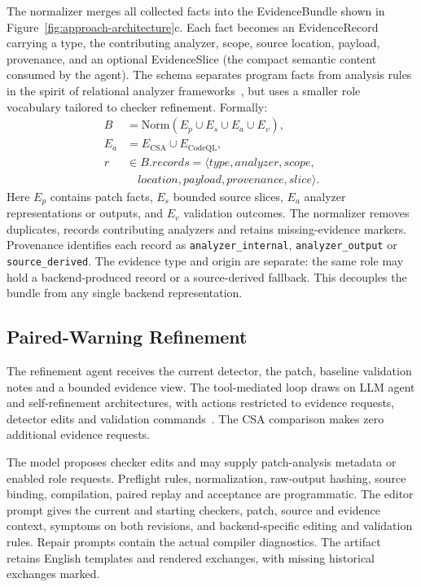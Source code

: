 The normalizer merges all collected facts into the EvidenceBundle shown in Figure~\ref{fig:approach-architecture}c.
Each fact becomes an EvidenceRecord carrying a type, the contributing analyzer, scope, source location, payload, provenance, and an optional EvidenceSlice (the compact semantic content consumed by the agent).
The schema separates program facts from analysis rules in the spirit of relational analyzer frameworks~\cite{avgustinov2016ql,jordan2016souffle,bravenboer2009doop}, but uses a smaller role vocabulary tailored to checker refinement.
Formally:
\begin{equation}
\begin{aligned}
B &= \mathrm{Norm}(E_p \cup E_s \cup E_a \cup E_v),\\
E_a &= E_{\mathrm{CSA}} \cup E_{\mathrm{CodeQL}},\\
r &\in B.records = \langle type, analyzer, scope,\\
&\quad location, payload, provenance, slice\rangle.
\end{aligned}
\label{eq:evidence-bundle}
\end{equation}
Here $E_p$ contains patch facts, $E_s$ bounded source slices, $E_a$ analyzer representations or outputs, and $E_v$ validation outcomes.
The normalizer removes duplicates, records contributing analyzers and retains missing-evidence markers.
Provenance identifies each record as \texttt{analyzer\_\allowbreak internal}, \texttt{analyzer\_\allowbreak output} or \texttt{source\_\allowbreak derived}.
The evidence type and origin are separate: the same role may hold a backend-produced record or a source-derived fallback.
This decouples the bundle from any single backend representation.

\subsection{Paired-Warning Refinement}
\label{sec:refinement}

The refinement agent receives the current detector, the patch, baseline validation notes and a bounded evidence view.
The tool-mediated loop draws on LLM agent and self-refinement architectures, with actions restricted to evidence requests, detector edits and validation commands~\cite{madaan2023selfrefine,shinn2023reflexion,yao2023react,schick2023toolformer}.
The CSA comparison makes zero additional evidence requests.

The model proposes checker edits and may supply patch-analysis metadata or enabled role requests.
Preflight rules, normalization, raw-output hashing, source binding, compilation, paired replay and acceptance are programmatic.
The editor prompt gives the current and starting checkers, patch, source and evidence context, symptoms on both revisions, and backend-specific editing and validation rules.
Repair prompts contain the actual compiler diagnostics.
The artifact retains English templates and rendered exchanges, with missing historical exchanges marked.

